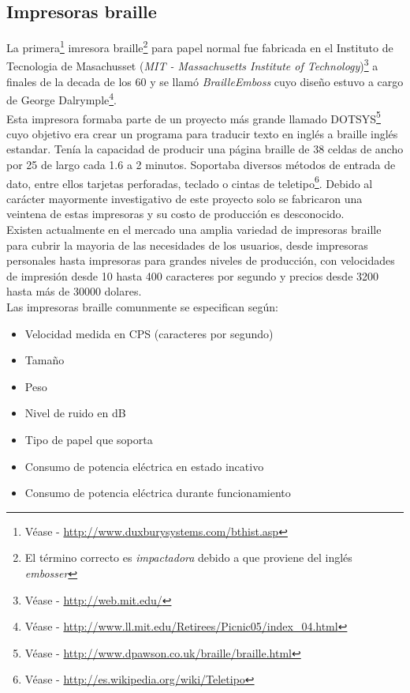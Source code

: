 \subsection{Impresoras braille}
%
La primera\footnote{V\'ease - \url{http://www.duxburysystems.com/bthist.asp}}
imresora braille\footnote{El t\'ermino correcto es \emph{impactadora} debido a
que proviene del ingl\'es \emph{embosser}} para papel normal fue fabricada en
el Instituto de Tecnologia de Masachusset (\emph{MIT - Massachusetts Institute
of Technology})\footnote{V\'ease - \url{http://web.mit.edu/}} a finales de la
decada de los 60 y se llam\'o \emph{BrailleEmboss} cuyo dise\~no estuvo a cargo
de George Dalrymple\footnote{V\'ease - \url{
http://www.ll.mit.edu/Retirees/Picnic05/index_04.html}}.\\

Esta impresora formaba parte de un proyecto m\'as grande llamado
DOTSYS\footnote{V\'ease - \url{http://www.dpawson.co.uk/braille/braille.html}}
cuyo objetivo era crear un programa para traducir texto en ingl\'es a braille
ingl\'es estandar. 
Ten\'ia la capacidad de producir una p\'agina braille de 38
celdas de ancho por 25 de largo cada 1.6 a 2 minutos.
Soportaba diversos m\'etodos de entrada de dato, entre ellos tarjetas
perforadas, teclado o cintas de teletipo\footnote{V\'ease -
\url{http://es.wikipedia.org/wiki/Teletipo}}. Debido al car\'acter mayormente
investigativo de este proyecto solo se fabricaron una veintena de estas
impresoras y su costo de producci\'on es desconocido.\\

Existen actualmente en el mercado una amplia variedad de impresoras braille
para cubrir la mayoria de las necesidades de los usuarios, desde impresoras
personales hasta impresoras para grandes niveles de producci\'on, con
velocidades de impresi\'on desde 10 hasta 400 caracteres por segundo y
precios desde 3200 hasta m\'as de 30000 dolares.\\

Las impresoras braille comunmente se especifican seg\'un:

\begin{itemize}
 \item Velocidad medida en CPS (caracteres por segundo)
 \item Tama\~no
 \item Peso
 \item Nivel de ruido en dB
 \item Tipo de papel que soporta
 \item Consumo de potencia el\'ectrica en estado incativo
 \item Consumo de potencia el\'ectrica durante funcionamiento
\end{itemize}


